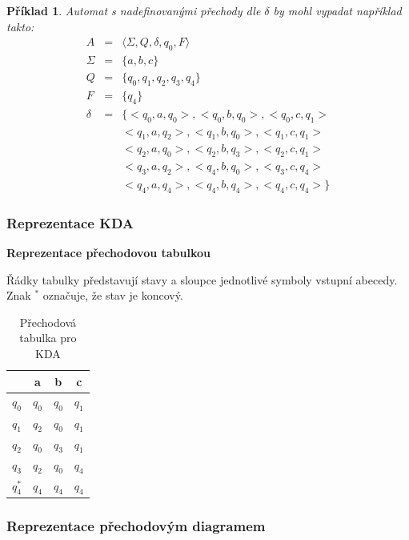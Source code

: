 \documentclass[10pt,a4paper]{article}
\theoremstyle{note}
\newtheorem{priklad}{Příklad}
\begin{document}
\begin{priklad}
Automat s nadefinovanými přechody dle $\delta$ by mohl vypadat například takto:
\begin{eqnarray*}
A &=& \langle \Sigma, Q, \delta, q_0, F \rangle \\
\Sigma &=& \lbrace a, b, c \rbrace \\
Q &=& \lbrace q_0, q_1, q_2, q_3, q_4 \rbrace \\
F &=& \lbrace q_4 \rbrace \\
\delta &=& \lbrace <q_0, a, q_0>, <q_0, b, q_0>, <q_0, c, q_1> \\
& & <q_1, a, q_2>, <q_1, b, q_0>, <q_1, c, q_1> \\
& & <q_2, a, q_0>, <q_2, b, q_3>, <q_2, c, q_1> \\
& & <q_3, a, q_2>, <q_4, b, q_0>, <q_3, c, q_4> \\
& & <q_4, a, q_4>, <q_4, b, q_4>, <q_4, c, q_4> \rbrace
\end{eqnarray*}
\end{priklad}

\subsubsection{Reprezentace KDA}
\textbf{Reprezentace přechodovou tabulkou}\\

\vspace{3mm}

Řádky tabulky představují stavy a sloupce jednotlivé symboly vstupní abecedy. Znak $^*$ označuje, že stav je koncový.
\begin{table}[h]
\begin{center}
\begin{tabular}{r || c | c | c}
 & a & b & c \\
\hline
 $q_0$ & $q_0$ & $q_0$ & $q_1$ \\
 $q_1$ & $q_2$ & $q_0$ & $q_1$ \\
 $q_2$ & $q_0$ & $q_3$ & $q_1$ \\
 $q_3$ & $q_2$ & $q_0$ & $q_4$ \\
 $q_4^*$ & $q_4$ & $q_4$ & $q_4$ \\
\end{tabular}
\end{center}
\caption{Přechodová tabulka pro KDA}
\end{table}


\subsubsection{Reprezentace přechodovým diagramem}
\end{document}
